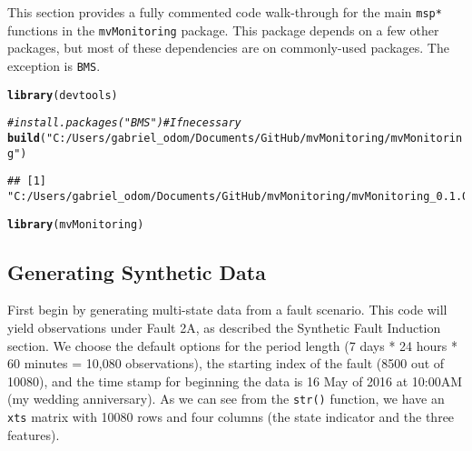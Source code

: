 \documentclass{report}\usepackage[]{graphicx}\usepackage[]{color}
\makeatletter
\newcommand{\hlstr}[1]{\textcolor[rgb]{0.192,0.494,0.8}{#1}}%
\newcommand{\hlcom}[1]{\textcolor[rgb]{0.678,0.584,0.686}{\textit{#1}}}%
\newcommand{\hlstd}[1]{\textcolor[rgb]{0.345,0.345,0.345}{#1}}%
\newcommand{\hlkwd}[1]{\textcolor[rgb]{0.737,0.353,0.396}{\textbf{#1}}}%
\newenvironment{kframe}{%
 \def\at@end@of@kframe{}%
 \ifinner\ifhmode%
  \def\at@end@of@kframe{\end{minipage}}%
  \begin{minipage}{\columnwidth}%
 \fi\fi%
 \def\FrameCommand##1{\hskip\@totalleftmargin \hskip-\fboxsep
 \colorbox{shadecolor}{##1}\hskip-\fboxsep
     \hskip-\linewidth \hskip-\@totalleftmargin \hskip\columnwidth}%
 \MakeFramed {\advance\hsize-\width
   \@totalleftmargin\z@ \linewidth\hsize
   \@setminipage}}%
 {\par\unskip\endMakeFramed%
 \at@end@of@kframe}
\newenvironment{knitrout}{}{} %
\makeatother
\begin{document}
This section provides a fully commented code walk-through for the main \texttt{msp*} functions in the \texttt{mvMonitoring} package. This package depends on a few other packages, but most of these dependencies are on commonly-used packages. The exception is \texttt{BMS}.
\begin{knitrout}
\color{fgcolor}\begin{kframe}
\begin{alltt}
\hlkwd{library}\hlstd{(devtools)}
\end{alltt}


{\ttfamily\noindent\color{warningcolor}{\#\# Warning: package 'devtools' was built under R version 3.4.1}}\begin{alltt}
\hlcom{# install.packages("BMS") # If necessary}
\hlkwd{build}\hlstd{(}\hlstr{"C:/Users/gabriel_odom/Documents/GitHub/mvMonitoring/mvMonitoring"}\hlstd{)}
\end{alltt}


{\ttfamily\noindent\itshape{}}

{\ttfamily\noindent\itshape\color{messagecolor}{\#\# }}\begin{verbatim}
## [1] "C:/Users/gabriel_odom/Documents/GitHub/mvMonitoring/mvMonitoring_0.1.0.tar.gz"
\end{verbatim}
\begin{alltt}
\hlkwd{library}\hlstd{(mvMonitoring)}
\end{alltt}
\end{kframe}
\end{knitrout}


\subsection{Generating Synthetic Data}
First begin by generating multi-state data from a fault scenario. This code will yield observations under Fault 2A, as described the Synthetic Fault Induction section. We choose the default options for the period length (7 days * 24 hours * 60 minutes = 10,080 observations), the starting index of the fault (8500 out of 10080), and the time stamp for beginning the data is 16 May of 2016 at 10:00AM (my wedding anniversary). As we can see from the \texttt{str()} function, we have an \texttt{xts} matrix with 10080 rows and four columns (the state indicator and the three features).
\end{document}
